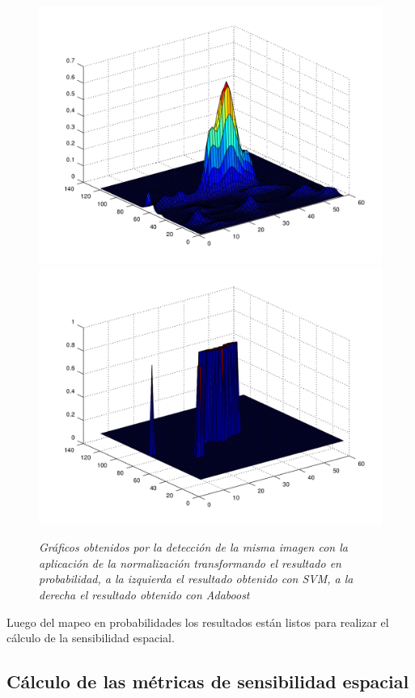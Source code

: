 \begin{figure}[htc]
  \centering
  \includegraphics[scale=.3]{images/svmoutput}
  \includegraphics[scale=.3]{images/boostoutput}
  \caption{\em Gráficos obtenidos por la detección de la misma imagen con la aplicación de la normalización transformando el resultado en  probabilidad, a la izquierda el resultado obtenido con SVM, a la derecha el resultado obtenido con Adaboost}  
  \label{fig:output}
\end{figure}

Luego del mapeo en probabilidades los resultados están listos para realizar el cálculo de la sensibilidad espacial.

\subsection{Cálculo de las métricas de sensibilidad espacial}

